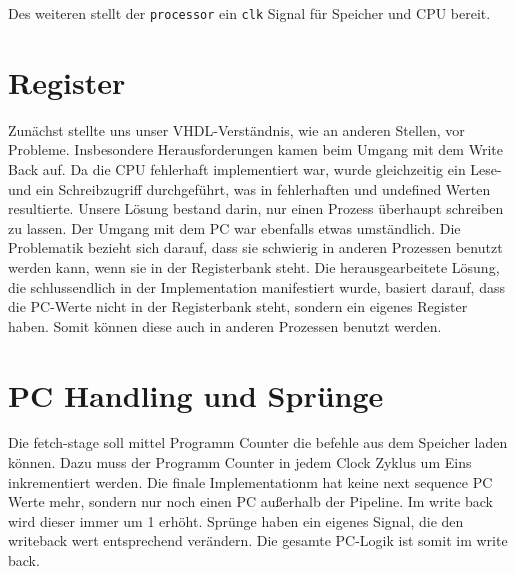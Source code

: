\documentclass[paper=a4,fontsize=12pt,twocolumn]{scrreprt}
\begin{document}
Des weiteren stellt der \texttt{processor} ein \texttt{clk} Signal für Speicher und CPU bereit.

\section{Register}





Zunächst stellte uns unser VHDL-Verständnis, wie an anderen Stellen, vor Probleme.
Insbesondere Herausforderungen kamen beim Umgang mit dem Write Back auf.
Da die CPU fehlerhaft implementiert war, wurde gleichzeitig ein Lese- und ein Schreibzugriff durchgeführt, was in fehlerhaften und undefined Werten resultierte. 
Unsere Lösung bestand darin, nur einen Prozess überhaupt schreiben zu lassen. Der Umgang mit dem PC war ebenfalls etwas umständlich.
Die Problematik bezieht sich darauf, dass sie schwierig in anderen Prozessen benutzt werden kann, wenn sie in der Registerbank steht.
Die herausgearbeitete Lösung, die schlussendlich in der Implementation manifestiert wurde, basiert darauf, dass die PC-Werte nicht in der Registerbank steht, sondern ein eigenes Register haben.
Somit können diese auch in anderen Prozessen benutzt werden.


\section{PC Handling und Sprünge}

Die fetch-stage soll mittel Programm Counter die befehle aus dem Speicher laden können. Dazu muss der Programm Counter in jedem Clock Zyklus um Eins inkrementiert werden. Die finale Implementationm hat keine next sequence PC Werte mehr, sondern nur noch einen PC außerhalb der Pipeline. Im write back wird dieser immer um 1 erhöht. Sprünge haben ein eigenes Signal, die den writeback wert entsprechend verändern. Die gesamte PC-Logik ist somit im write back.
\end{document}

